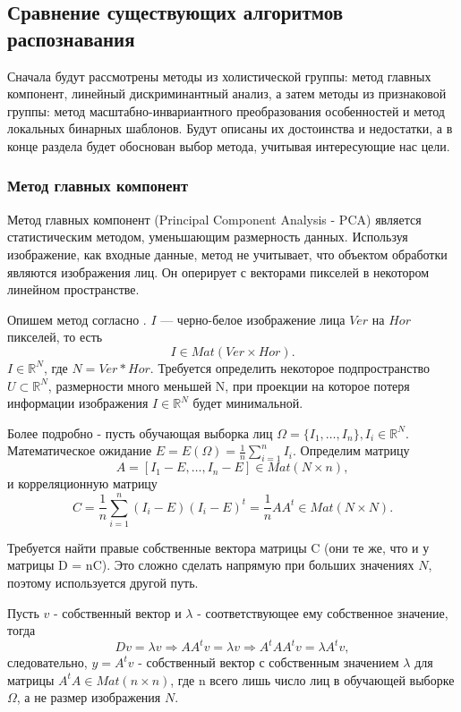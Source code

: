 \documentclass[a4paper,12pt]{report}
\numberwithin{equation}{section}
\begin{document}
\subsection{Сравнение существующих алгоритмов распознавания} 
Сначала будут рассмотрены методы из холистической группы: метод главных
компонент, линейный дискриминантный анализ, а затем методы из признаковой
группы: метод масштабно-инвариантного преобразования особенностей
и метод локальных бинарных шаблонов. Будут описаны их достоинства и
недостатки, а в конце раздела будет обоснован выбор метода, учитывая
интересующие нас цели.  
\subsubsection{Метод главных компонент}

Метод главных компонент (Principal Component Analysis - PCA)
\cite{PCA} является статистическим методом, уменьшающим размерность
данных. Используя изображение, как входные данные, метод не учитывает, что
объектом обработки являются изображения лиц. Он оперирует с векторами пикселей в
некотором линейном пространстве.


Опишем метод согласно \cite{PCA-about}. $I$ --- черно-белое изображение лица
$Ver$ на $Hor$ пикселей, то есть
\[ I \in Mat(Ver \times Hor).\] $I \in \mathbb{R}^N$, где $N = Ver *
Hor$. Требуется определить некоторое подпространство $U \subset \mathbb{R}^N$,
размерности много меньшей N, при проекции на которое потеря информации
изображения $I \in \mathbb{R}^N$ будет минимальной.


Более подробно - пусть обучающая выборка лиц $\Omega = \{I_1,\dots,I_n\}, I_i
\in \mathbb{R}^N$. Математическое ожидание $E = E(\Omega) =
\frac{1}{n}\sum_{i=1}^nI_i$. Определим матрицу
\[ A =  [I_1 - E,\dots,I_n - E] \in Mat(N \times n),\]
и корреляционную матрицу
\[ C = \frac{1}{n}\sum_{i=1}^n(I_i - E)(I_i - E)^t = \frac{1}{n}AA^t \in Mat(N \times N). \]

Требуется найти правые собственные вектора матрицы C (они те же, что и у матрицы
D = nC). Это сложно сделать напрямую при больших значениях $N$, поэтому
используется другой путь.


Пусть $v$ - собственный вектор и $\lambda$ - соответствующее ему собственное
значение, тогда 
\[ Dv = \lambda v \Rightarrow AA^tv = \lambda v \Rightarrow A^tAA^tv = \lambda A^tv ,\]
следовательно, $y = A^tv$ - собственный вектор с собственным значением $\lambda$
для матрицы $A^tA \in Mat(n \times n)$, где n всего лишь число лиц в обучающей
выборке $\Omega$, а не размер изображения $N$.
\end{document}
